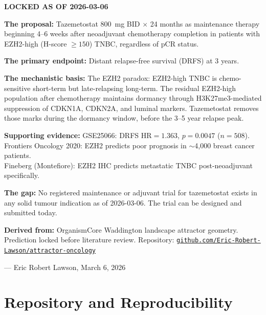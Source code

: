 \documentclass[12pt, a4paper]{article}
\begin{document}
\begin{center}
\colorbox{urgentbox}{
\begin{minipage}{0.88\textwidth}
\vspace{0.6em}
\textbf{LOCKED AS OF 2026-03-06}

\medskip
\textbf{The proposal:}
Tazemetostat 800~mg BID $\times$ 24 months as
maintenance therapy beginning 4--6 weeks after
neoadjuvant chemotherapy completion in patients
with EZH2-high (H-score $\geq150$) TNBC,
regardless of pCR status.

\medskip
\textbf{The primary endpoint:}
Distant relapse-free survival (DRFS) at 3 years.

\medskip
\textbf{The mechanistic basis:}
The EZH2 paradox: EZH2-high TNBC is chemo-sensitive
short-term but late-relapsing long-term.
The residual EZH2-high population after chemotherapy
maintains dormancy through H3K27me3-mediated
suppression of CDKN1A, CDKN2A, and luminal markers.
Tazemetostat removes those marks during the
dormancy window, before the 3--5 year relapse peak.

\medskip
\textbf{Supporting evidence:}
GSE25066: DRFS HR$=1.363$, $p=0.0047$ ($n=508$).\\
Frontiers Oncology 2020: EZH2 predicts poor prognosis
in $\sim$4,000 breast cancer patients.\\
Fineberg (Montefiore): EZH2 IHC predicts metastatic
TNBC post-neoadjuvant specifically.

\medskip
\textbf{The gap:}
No registered maintenance or adjuvant trial for
tazemetostat exists in any solid tumour indication
as of 2026-03-06. The trial can be designed and
submitted today.

\medskip
\textbf{Derived from:}
OrganismCore Waddington landscape attractor geometry.
Prediction locked before literature review.
Repository:
\href{https://github.com/Eric-Robert-Lawson/attractor-oncology}
{\texttt{github.com/Eric-Robert-Lawson/attractor-oncology}}

\medskip
\hfill --- Eric Robert Lawson, March 6, 2026
\vspace{0.4em}
\end{minipage}
}
\end{center}

\section*{Repository and Reproducibility}
\end{document}
